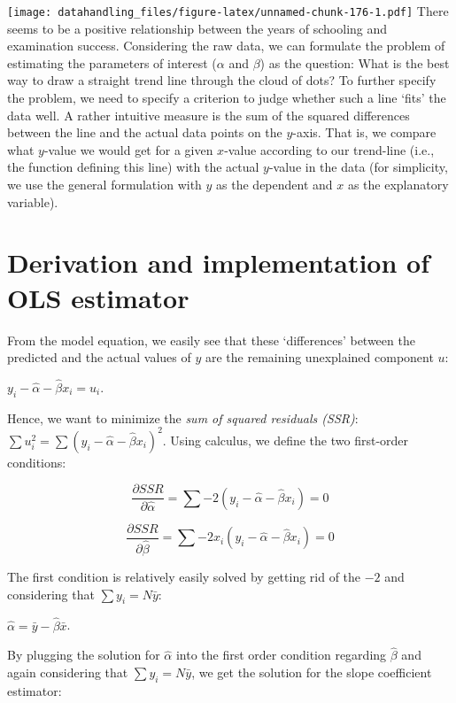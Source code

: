 \documentclass[
  12pt,
]{style/krantz}
\begin{document}
\texttt{[image: datahandling\_files/figure-latex/unnamed-chunk-176-1.pdf]}
There seems to be a positive relationship between the years of schooling and examination success. Considering the raw data, we can formulate the problem of estimating the parameters of interest (\(\alpha\) and \(\beta\)) as the question: What is the best way to draw a straight trend line through the cloud of dots? To further specify the problem, we need to specify a criterion to judge whether such a line `fits' the data well. A rather intuitive measure is the sum of the squared differences between the line and the actual data points on the \(y\)-axis. That is, we compare what \(y\)-value we would get for a given \(x\)-value according to our trend-line (i.e., the function defining this line) with the actual \(y\)-value in the data (for simplicity, we use the general formulation with \(y\) as the dependent and \(x\) as the explanatory variable).

\hypertarget{derivation-and-implementation-of-ols-estimator}{%
\section{Derivation and implementation of OLS estimator}\label{derivation-and-implementation-of-ols-estimator}}

From the model equation, we easily see that these `differences' between the predicted and the actual values of \(y\) are the remaining unexplained component \(u\):

\(y_{i}-\hat{\alpha}-\hat{\beta} x_i=u_i\).

Hence, we want to minimize the \emph{sum of squared residuals (SSR)}: \(\sum{u_i^2}=\sum{(y_{i}-\hat{\alpha}-\hat{\beta} x_i)^2}\). Using calculus, we define the two first-order conditions:

\[\frac{\partial SSR}{\partial \hat{\alpha}}=\sum{-2(y_{i}-\hat{\alpha}-\hat{\beta} x_i)}=0\]

\[\frac{\partial SSR}{\partial \hat{\beta}}=\sum{-2x_i(y_{i}-\hat{\alpha}-\hat{\beta} x_i)}=0\]

The first condition is relatively easily solved by getting rid of the \(-2\) and considering that \(\sum{y_i}=N\bar{y}\):

\(\hat{\alpha}=\bar{y}-\hat{\beta}\bar{x}\).

By plugging the solution for \(\hat{\alpha}\) into the first order condition regarding \(\hat{\beta}\) and again considering that \(\sum{y_i}=N\bar{y}\), we get the solution for the slope coefficient estimator:
\end{document}
